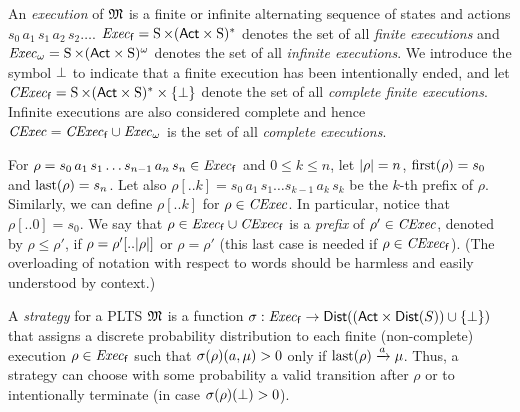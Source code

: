 
An \emph{execution} of ${\mathfrak{M}}$ is a finite or infinite alternating
sequence of states and actions $s_0\, a_1\, s_1\, a_2\, s_2\ldots$.
$\mathit{Exec}_{\mathsf{f}}= \operatorname{S}\times({\rm \sf Act}\times\operatorname{S})^*$ denotes the set of all
\emph{finite executions} and $\mathit{Exec}_\omega= \operatorname{S}\times({\rm \sf Act}\times\operatorname{S})^\omega$
denotes the set of all \emph{infinite executions}.
%
We introduce the symbol $\bot$ to indicate that a finite
execution has been intentionally ended,  and let $\mathit{CExec}_{\mathsf{f}}=
\operatorname{S}\times({\rm \sf Act}\times\operatorname{S})^*\times\{\bot\}$ denote the set of all
\emph{complete finite executions}.  Infinite executions are also
considered complete and hence $\mathit{CExec}=\mathit{CExec}_{\mathsf{f}}\cup\mathit{Exec}_\omega$ is the
set of all \emph{complete executions}.

For $\rho = s_0\, a_1\, s_1\ldots s_{n-1}\, a_n\, s_n \in \mathit{Exec}_{\mathsf{f}}$ and
$0\leq k\leq n$, let ${|}{\rho}{|}=n$, $\mathrm{first}(\rho)=s_0$ and
$\mathrm{last}(\rho)=s_n$.
%
Let also $\rho[..k] = s_0\, a_1\, s_1\ldots s_{k-1}\, a_k\, s_k$ be
the $k$-th prefix of $\rho$.
%
Similarly, we can define $\rho[..k]$ for $\rho\in\mathit{CExec}$.
In particular, notice that $\rho[..0]=s_0$.
%
We say that $\rho \in \mathit{Exec}_{\mathsf{f}}\cup\mathit{CExec}_{\mathsf{f}}$ is a \emph{prefix} of $\rho' \in \mathit{CExec}$,
denoted by $\rho\leq\rho'$, if $\rho=\rho'[..{|}{\rho}{|}]$ or $\rho=\rho'$
(this last case is needed if $\rho\in\mathit{CExec}_{\mathsf{f}}$).
%
(The overloading of notation with respect to words should be harmless
and easily understood by context.)

A \emph{strategy} for a PLTS ${\mathfrak{M}}$ is a function $\sigma:
\mathit{Exec}_{\mathsf{f}} \to \mathsf{Dist}(({\rm \sf Act}\times\mathsf{Dist}(S))\cup\{\bot\})$ that assigns
a discrete probability distribution to each finite (non-complete)
execution $\rho\in\mathit{Exec}_{\mathsf{f}}$ such that $\sigma(\rho)(a,\mu) > 0$ only
if $\mathrm{last}(\rho)\xrightarrow{a}\mu$.  Thus, a strategy can choose with some
probability a valid transition after $\rho$ or to intentionally
terminate (in case $\sigma(\rho)(\bot)>0$).

